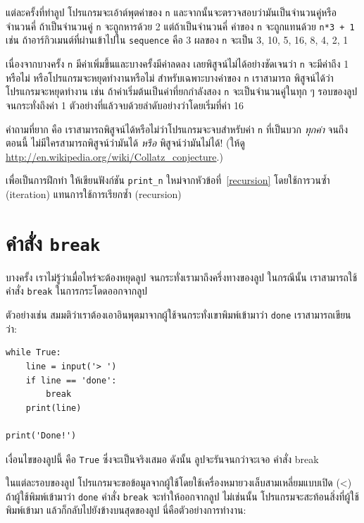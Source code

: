 แต่ละครั้งที่ทำลูป โปรแกรมจะเอ้าต์พุตค่าของ {\tt n} และจากนั้นจะตรวจสอบว่ามันเป็นจำนวนคู่หรือจำนวนคี่
ถ้าเป็นจำนวนคู่ {\tt n} จะถูกหารด้วย 2 แต่ถ้าเป็นจำนวนคี่ ค่าของ {\tt n} จะถูกแทนด้วย {\tt n*3 + 1}
เช่น ถ้าอาร์กิวเมนต์ที่ผ่านเข้าไปใน {\tt sequence} คือ 3 ผลของ {\tt n} จะเป็น
3, 10, 5, 16, 8, 4, 2, 1

เนื่องจากบางครั้ง {\tt n} มีค่าเพิ่มขึ้นและบางครั้งมีค่าลดลง เลยพิสูจน์ไม่ได้อย่างชัดเจนว่า {\tt n}
จะมีค่าถึง 1 หรือไม่ หรือโปรแกรมจะหยุดทำงานหรือไม่ สำหรับเฉพาะบางค่าของ {\tt n} เราสามารถ
พิสูจน์ได้ว่าโปรแกรมจะหยุดทำงาน เช่น ถ้าค่าเริ่มต้นเป็นค่าที่ยกกำลังสอง {\tt n} 
จะเป็นจำนวนคู่ในทุก ๆ รอบของลูปจนกระทั่งถึงค่า 1  ตัวอย่างที่แล้วจบด้วยลำดับอย่างว่าโดยเริ่มที่ค่า 16

คำถามที่ยาก คือ เราสามารถพิสูจน์ได้หรือไม่ว่าโปรแกรมจะจบสำหรับค่า {\tt n} ที่เป็นบวก {\em ทุกค่า}
จนถึงตอนนี้ ไม่มีใครสามารถพิสูจน์ว่ามันได้ {\em หรือ} พิสูจน์ว่ามันไม่ได้! (ให้ดู
\url{http://en.wikipedia.org/wiki/Collatz_conjecture}.)

เพื่อเป็นการฝึกทำ ให้เขียนฟังก์ชัน \verb"print_n" ใหม่จากหัวข้อที่~\ref{recursion}
โดยใช้การวนซ้ำ (iteration) แทนการใช้การเรียกซ้ำ (recursion)


\section{คำสั่ง {\tt break}}

บางครั้ง เราไม่รู้ว่าเมื่อไหร่จะต้องหยุดลูป จนกระทั่งเรามาถึงครึ่งทางของลูป ในกรณีนั้น
เราสามารถใช้คำสั่ง {\tt break} ในการกระโดดออกจากลูป

ตัวอย่างเช่น สมมติว่าเราต้องเอาอินพุตมาจากผู้ใช้จนกระทั่งเขาพิมพ์เข้ามาว่า {\tt done}
เราสามารถเขียนว่า:

\begin{verbatim}
while True:
    line = input('> ')
    if line == 'done':
        break
    print(line)

print('Done!')
\end{verbatim}
%
เงื่อนไขของลูปนี้ คือ {\tt True} ซึ่งจะเป็นจริงเสมอ ดังนั้น ลูปจะรันจนกว่าจะเจอ
คำสั่ง break

ในแต่ละรอบของลูป โปรแกรมจะขอข้อมูลจากผู้ใช้โดยใช้เครื่องหมายวงเล็บสามเหลี่ยมแบบเปิด (<) 
ถ้าผู้ใช้พิมพ์เข้ามาว่า {\tt done} คำสั่ง {\tt break} จะทำให้ออกจากลูป  ไม่เช่นนั้น
โปรแกรมจะสะท้อนสิ่งที่ผู้ใช้พิมพ์เข้ามา แล้วก็กลับไปยังข้างบนสุดของลูป นี่คือตัวอย่างการทำงาน:

